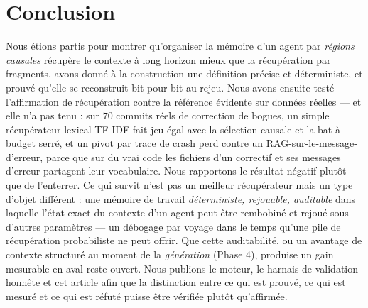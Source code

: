 \documentclass[11pt]{article}
\begin{document}
\section{Conclusion}

Nous étions partis pour montrer qu'organiser la mémoire d'un agent par \emph{régions
causales} récupère le contexte à long horizon mieux que la récupération par fragments, avons
donné à la construction une définition précise et déterministe, et prouvé qu'elle se
reconstruit bit pour bit au rejeu. Nous avons ensuite testé l'affirmation de récupération
contre la référence évidente sur données réelles --- et elle n'a pas tenu : sur $70$ commits
réels de correction de bogues, un simple récupérateur lexical TF-IDF fait jeu égal avec la
sélection causale et la bat à budget serré, et un pivot par trace de crash perd contre un
RAG-sur-le-message-d'erreur, parce que sur du vrai code les fichiers d'un correctif et ses
messages d'erreur partagent leur vocabulaire. Nous rapportons le résultat négatif plutôt que
de l'enterrer. Ce qui survit n'est pas un meilleur récupérateur mais un type d'objet
différent : une mémoire de travail \emph{déterministe, rejouable, auditable} dans laquelle
l'état exact du contexte d'un agent peut être rembobiné et rejoué sous d'autres paramètres
--- un débogage par voyage dans le temps qu'une pile de récupération probabiliste ne peut
offrir. Que cette auditabilité, ou un avantage de contexte structuré au moment de la
\emph{génération} (Phase 4), produise un gain mesurable en aval reste ouvert. Nous publions
le moteur, le harnais de validation honnête et cet article afin que la distinction entre ce
qui est prouvé, ce qui est mesuré et ce qui est réfuté puisse être vérifiée plutôt
qu'affirmée.
\end{document}
